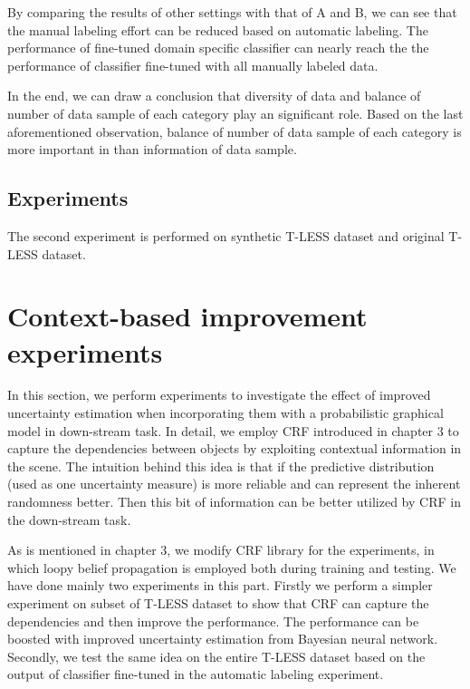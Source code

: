 By comparing the results of other settings with that of A and B, we can see that the manual labeling effort can be reduced based on automatic labeling.  The performance of fine-tuned domain specific classifier can nearly reach the the performance of classifier fine-tuned with all manually labeled data. 

In the end, we can draw a conclusion that diversity of data and balance of number of data sample of each category play an significant role. Based on the last aforementioned observation, balance of number of data sample of each category is more important in than information of data sample.

\subsection{Experiments }
The second experiment is performed on synthetic T-LESS dataset and original T-LESS dataset.


\section{Context-based improvement experiments}
In this section, we perform experiments to investigate the effect of improved uncertainty estimation when incorporating them with a probabilistic graphical model in down-stream task. In detail, we employ CRF introduced in chapter 3 to capture the dependencies between objects by exploiting contextual information in the scene. The intuition behind this idea is that if the predictive distribution (used as one uncertainty measure) is more reliable and can represent the inherent randomness better. Then this bit of information can be better utilized by CRF in the down-stream task. 

As is mentioned in chapter 3, we modify CRF library \cite{Ruiz-Sarmiento-REACTS-2015} for the experiments, in which loopy belief propagation is employed both during training and testing. We have done mainly two experiments in this part. Firstly we perform a simpler experiment on subset of T-LESS dataset to show that CRF can capture the dependencies and then improve the performance. The performance can be boosted with improved uncertainty estimation from Bayesian neural network. Secondly, we test the same idea on the entire T-LESS dataset based on the output of classifier fine-tuned in the automatic labeling experiment. 


